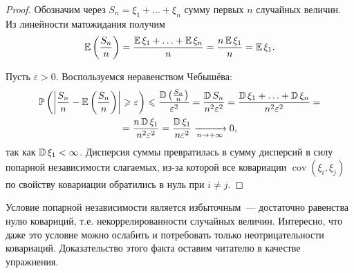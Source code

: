 \begin{proof}
    Обозначим через $S_n = \xi_1 + \ldots + \xi_n$ сумму первых $n$ случайных величин. Из линейности матожидания получим
    \begin{equation*}
        \operatorname{\mathbb{E}} \left(\frac{S_{n}}{n}\right)=\frac{\operatorname{\mathbb{E}} \xi_{1}+\ldots+\operatorname{\mathbb{E}} \xi_{n}}{n}=\frac{n \operatorname{\mathbb{E}} \xi_{1}}{n}=\operatorname{\mathbb{E}} \xi_{1}.
    \end{equation*}
    
    Пусть $\varepsilon > 0.$ Воспользуемся неравенством Чебышёва:
    \begin{multline*}
        \operatorname{\mathbb{P}}\left(\left|\frac{S_{n}}{n}-\operatorname{\mathbb{E}} \left(\frac{S_{n}}{n}\right)\right| \geqslant \varepsilon\right) \leqslant \frac{\operatorname{\mathbb{D}}\left(\frac{S_{n}}{n}\right)}{\varepsilon^{2}}
        = \frac{\operatorname{\mathbb{D}} S_{n}}{n^{2} \varepsilon^{2}}
        = \frac{\operatorname{\mathbb{D}} \xi_{1}+\ldots+\operatorname{\mathbb{D}} \xi_{n}}{n^{2} \varepsilon^{2}}= \\
        = \frac{n \operatorname{\mathbb{D}} \xi_{1}}{n^{2} \varepsilon^{2}}
        = \frac{\operatorname{\mathbb{D}} \xi_{1}}{n \varepsilon^{2}} \xrightarrow[n \to +\infty]{} 0,
    \end{multline*}
    так как $\operatorname{\mathbb{D}}\xi_1 < \infty$. Дисперсия суммы превратилась в сумму дисперсий в силу попарной независимости слагаемых, из-за которой все ковариации $\operatorname{cov}(\xi_i, \xi_j)$ по свойству ковариации обратились в нуль при $i \neq j$.
\end{proof}

\begin{rmrk}
    Условие попарной независимости является избыточным~--- достаточно равенства нулю ковариций, т.е. некоррелированности случайных величин.
    Интересно, что даже это условие можно ослабить и потребовать только неотрицательности ковариаций.
    Доказательство этого факта оставим читателю в качестве упражнения.
\end{rmrk}